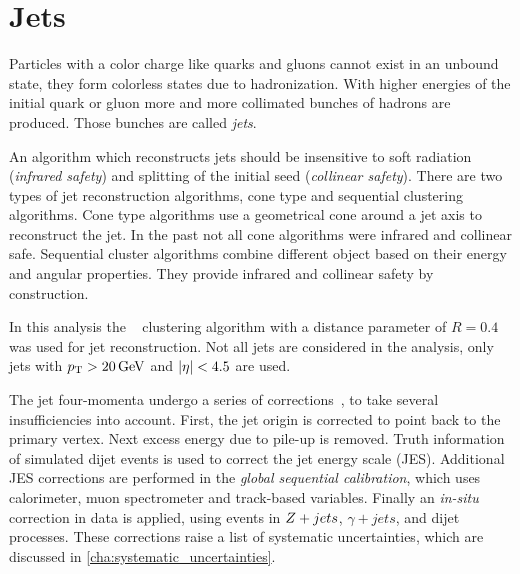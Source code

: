 \section{Jets}\label{sec:object_selection:jets}

Particles with a color charge like quarks and gluons cannot exist in an unbound state,
they form colorless states due to hadronization.
With higher energies of the initial quark or gluon more and more collimated bunches of hadrons are produced.
Those bunches are called \emph{jets}.

An algorithm which reconstructs jets should be insensitive to soft radiation (\emph{infrared safety})
and splitting of the initial seed (\emph{collinear safety}).
There are two types of jet reconstruction algorithms, cone type and sequential clustering algorithms.
Cone type algorithms use a geometrical cone around a jet axis to reconstruct the jet. In the past not
all cone algorithms were infrared and collinear safe.
Sequential cluster algorithms combine different object based on their energy and angular properties.
They provide infrared and collinear safety by construction.

In this analysis the \antikt{}~\cite{Cacciari:2008gp,Cacciari:2005hq} clustering algorithm with a distance parameter
of $R = 0.4$ was used for jet reconstruction.
Not all jets are considered in the analysis, only jets with $\pt > \unit[20]{GeV}$ and $\left|\eta\right| < 4.5$ are used.

The jet four-momenta undergo a series of corrections~\cite{PERF-2016-04}, to take several insufficiencies into account.
First, the jet origin is corrected to point back to the primary vertex. Next excess energy due to pile-up is removed.
Truth information of simulated dijet events is used to correct the jet energy scale (JES).
Additional JES corrections are performed in the \emph{global sequential calibration}, which uses calorimeter, muon
spectrometer and track-based variables. Finally an \emph{in-situ} correction in data is applied, using events
in $Z+jets$, $\gamma + jets$, and dijet processes.
These corrections raise a list of systematic uncertainties, which are discussed in \cref{cha:systematic_uncertainties}.

